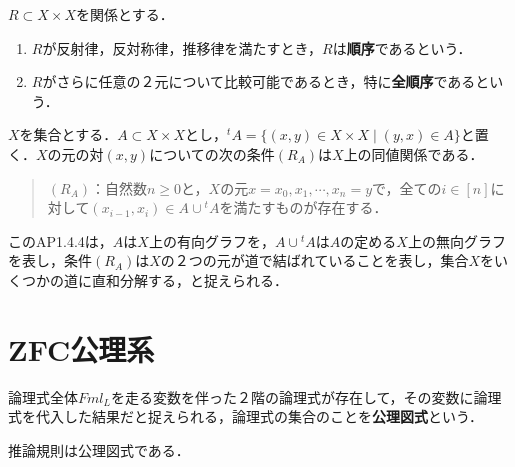 \documentclass[uplatex, 12pt, dvipdfmx]{jsreport}
\begin{document}
\begin{definition}[order]
    $R\subset X\times X$を関係とする．
    \begin{enumerate}
        \item $R$が反射律，反対称律，推移律を満たすとき，$R$は\textbf{順序}であるという．
        \item $R$がさらに任意の２元について比較可能であるとき，特に\textbf{全順序}であるという．
    \end{enumerate}
\end{definition}

\begin{problem}[AP1.4.4：部分集合Aによって生成される同値関係]
    $X$を集合とする．$A\subset X\times X$とし，${}^t\!A=\{ (x,y)\in X\times X\mid(y,x)\in A\}$と置く．$X$の元の対$(x,y)$についての次の条件$(R_A)$は$X$上の同値関係である．
    \begin{quote}
        $(R_A)$：自然数$n\ge 0$と，$X$の元$x=x_0,x_1,\cdots,x_n=y$で，全ての$i\in [n]$に対して$(x_{i-1},x_i)\in A\cup {}^t\!A$を満たすものが存在する．
    \end{quote}
\end{problem}
\begin{remark}
    このAP1.4.4は，$A$は$X$上の有向グラフを，$A\cup {}^t\!A$は$A$の定める$X$上の無向グラフを表し，条件$(R_A)$は$X$の２つの元が道で結ばれていることを表し，集合$X$をいくつかの道に直和分解する，と捉えられる．
\end{remark}

\section{ZFC公理系}

\begin{definition}
    論理式全体$Fml_L$を走る変数を伴った２階の論理式が存在して，その変数に論理式を代入した結果だと捉えられる，論理式の集合のことを\textbf{公理図式}という．
\end{definition}
\begin{example}
    推論規則は公理図式である．
\end{example}
\end{document}

